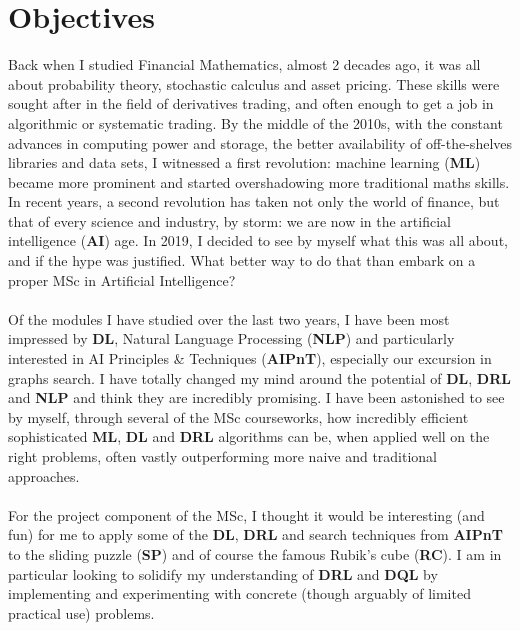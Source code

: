 
\chapter{Objectives} %

\label{Chapter0} %



Back when I studied Financial Mathematics, almost 2 decades ago, it was all about probability theory, stochastic calculus and asset pricing. These skills were sought after in the field of derivatives trading, and often enough to get a job in algorithmic or systematic trading. By the middle of the 2010s, with the constant advances in computing power and storage, the better availability of off-the-shelves libraries and data sets, I witnessed a first revolution: machine learning (\textbf{ML}) became more prominent and started overshadowing more traditional maths skills. In recent years, a second revolution has taken not only the world of finance, but that of every science and industry, by storm: we are now in the artificial intelligence (\textbf{AI}) age. In 2019, I decided to see by myself what this was all about, and if the hype was justified. What better way to do that than embark on a proper MSc in Artificial Intelligence?
\\
\\
Of the modules I have studied over the last two years, I have been most impressed by \textbf{DL},  Natural Language Processing (\textbf{NLP}) and particularly interested in AI Principles \& Techniques (\textbf{AIPnT}), especially our excursion in graphs search. I have totally changed my mind around the potential of \textbf{DL}, \textbf{DRL} and \textbf{NLP} and think they are incredibly promising. I have been astonished to see by myself, through several of the MSc courseworks, how incredibly efficient sophisticated \textbf{ML}, \textbf{DL} and \textbf{DRL} algorithms can be, when applied well on the right problems, often vastly outperforming more naive and traditional approaches.
\\
\\
For the project component of the MSc, I thought it would be interesting (and fun) for me to apply some of the \textbf{DL}, \textbf{DRL} and search techniques from \textbf{AIPnT} to the sliding puzzle (\textbf{SP}) and of course the famous Rubik's cube (\textbf{RC}). I am in particular looking to solidify my understanding of \textbf{DRL} and \textbf{DQL} by  implementing and experimenting with concrete (though arguably of limited practical use) problems.


